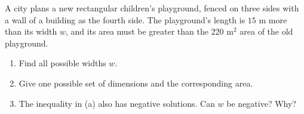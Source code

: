 A city plans a new rectangular children's playground, fenced on three sides with a wall of a building as the fourth side. The playground's length is $15$ m more than its width $w$, and its area must be greater than the $220\text{ m}^2$ area of the old playground.
\begin{enumerate}
\item[(a)] Find all possible widths $w$.
\item[(b)] Give one possible set of dimensions and the corresponding area.
\item[(c)] The inequality in (a) also has negative solutions. Can $w$ be negative? Why?
\end{enumerate}
